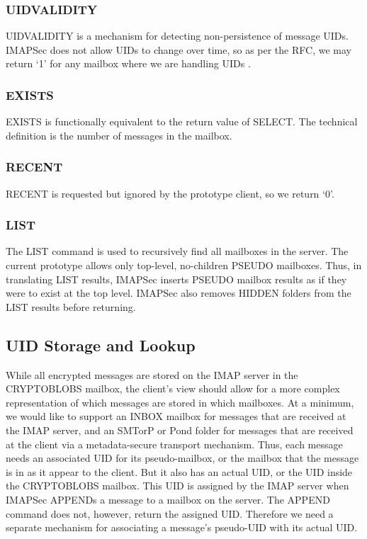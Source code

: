 \documentclass[pageno]{jpaper}
\newcommand{\project}{IMAPSec }
\begin{document}
\subsubsection{UIDVALIDITY} UIDVALIDITY is a mechanism for detecting non-persistence of message UIDs. \project does not allow UIDs to change over time, so as per the RFC, we may return `1' for any mailbox where we are handling UIDs \cite{rfc3501}.

\label{exists}
\subsubsection{EXISTS} EXISTS is functionally equivalent to the return value of SELECT. The technical definition is the number of messages in the mailbox.

\subsubsection{RECENT} RECENT is requested but ignored by the prototype client, so we return `0'.

\subsubsection{LIST} The LIST command is used to recursively find all mailboxes in the server. The current prototype allows only top-level, no-children PSEUDO mailboxes. Thus, in translating LIST results, \project inserts PSEUDO mailbox results as if they were to exist at the top level. \project also removes HIDDEN folders from the LIST results before returning.

\label{uid-translation}
\subsection{UID Storage and Lookup}
While all encrypted messages are stored on the IMAP server in the CRYPTOBLOBS mailbox, the client's view should allow for a more complex representation of which messages are stored in which mailboxes. At a minimum, we would like to support an INBOX mailbox for messages that are received at the IMAP server, and an SMTorP or Pond folder for messages that are received at the client via a metadata-secure transport mechanism. Thus, each message needs an associated UID for its pseudo-mailbox, or the mailbox that the message is in as it appear to the client. But it also has an actual UID, or the UID inside the CRYPTOBLOBS mailbox. This UID is assigned by the IMAP server when \project APPENDs a message to a mailbox on the server. The APPEND command does not, however, return the assigned UID. Therefore we need a separate mechanism for associating a message's pseudo-UID with its actual UID.
\end{document}
